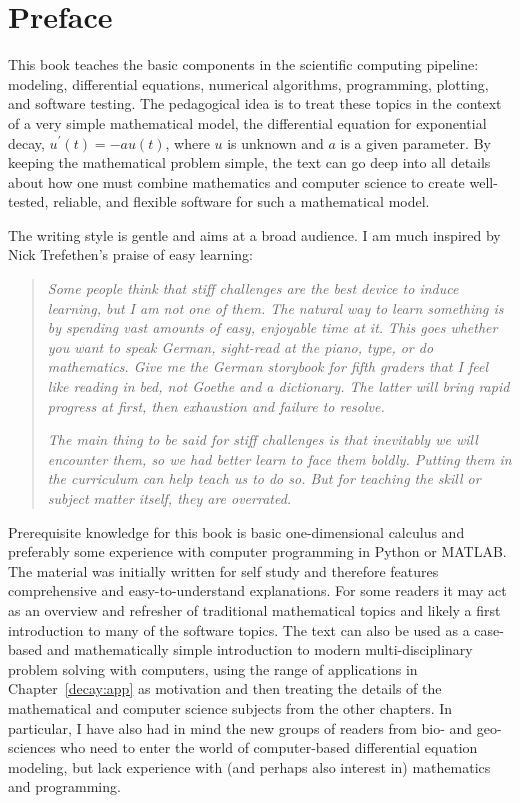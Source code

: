\documentclass[graybox,sectrefs,envcountresetchap,open=right,final]{svmonodo}
\begin{document}
\vfill
\clearpage

\setpagesize

\chapter*{Preface}
\label{ch:preface}


This book teaches the basic components in the scientific
computing pipeline: modeling, differential equations, numerical
algorithms, programming, plotting, and software testing. The pedagogical idea
is to treat these topics in the context of a very simple
mathematical model, the
differential equation for exponential decay, $u^{\prime}(t)=-au(t)$,
where $u$ is unknown and $a$ is a given parameter. By keeping the
mathematical problem simple, the text can go deep into all details
about how one must combine mathematics and computer science to
create well-tested, reliable, and flexible software for such a
mathematical model.

The writing style is gentle and aims at a broad audience. I am much
inspired by Nick Trefethen's praise of easy learning:


\begin{quote}
\emph{Some people think that stiff challenges are the best device to
induce learning, but I am not one of them. The natural way to learn
something is by spending vast amounts of easy, enjoyable time at it.
This goes whether you want to speak German, sight-read at the
piano, type, or do mathematics. Give me the German storybook for
fifth graders that I feel like reading in bed, not Goethe and a
dictionary. The latter will bring rapid progress at first, then
exhaustion and failure to resolve.}

\emph{The main thing to be said for stiff challenges is that inevitably
we will encounter them, so we had better learn to face them boldly.
Putting them in the curriculum can help teach us to do so. But for
teaching the skill or subject matter itself, they are overrated.}
\cite[p.~86]{index_cards}
\end{quote}


Prerequisite knowledge for this book is basic one-dimensional calculus
and preferably some experience with computer programming in Python or
MATLAB.  The material was initially written for self study and
therefore features comprehensive and easy-to-understand
explanations. For some readers it may act as an overview and refresher
of traditional mathematical topics and likely a first introduction to
many of the software topics. The text can also be used as a case-based
and mathematically simple introduction to modern multi-disciplinary
problem solving with computers, using the range of applications in
Chapter~\ref{decay:app} as motivation and then treating the details of
the mathematical and computer science subjects from the other
chapters. In particular, I have also had in mind the new groups of
readers from bio- and geo-sciences who need to enter the world of
computer-based differential equation modeling, but lack experience
with (and perhaps also interest in) mathematics and programming.
\end{document}
